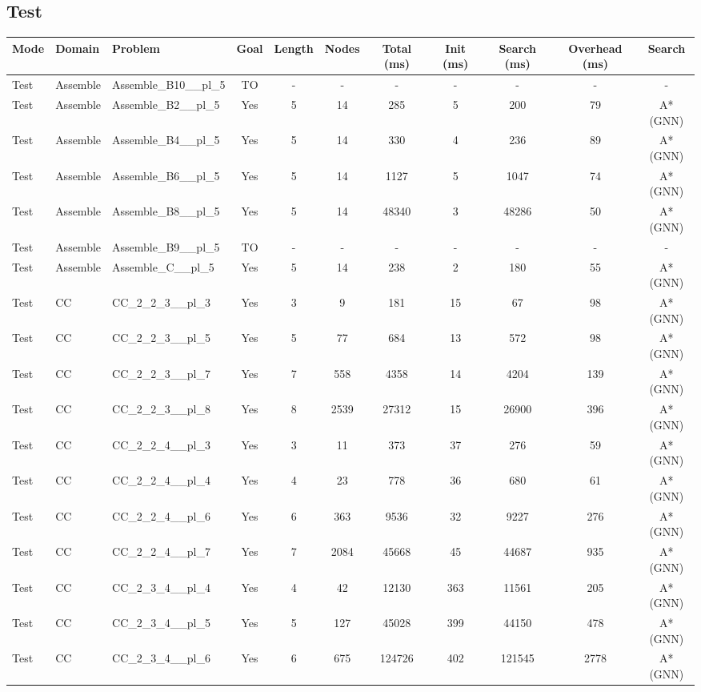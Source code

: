 \documentclass{article}
\begin{document}
\subsection*{Test}
\begin{tabular}{lllcccccccc}
\toprule
Mode & Domain & Problem & Goal & Length & Nodes & Total (ms) & Init (ms) & Search (ms) & Overhead (ms) & Search \\
\midrule
Test & Assemble & Assemble\_B10\_\_pl\_5 & TO & - & - & - & - & - & - & - \\
Test & Assemble & Assemble\_B2\_\_pl\_5 & Yes & 5 & 14 & 285 & 5 & 200 & 79 & A*(GNN) \\
Test & Assemble & Assemble\_B4\_\_pl\_5 & Yes & 5 & 14 & 330 & 4 & 236 & 89 & A*(GNN) \\
Test & Assemble & Assemble\_B6\_\_pl\_5 & Yes & 5 & 14 & 1127 & 5 & 1047 & 74 & A*(GNN) \\
Test & Assemble & Assemble\_B8\_\_pl\_5 & Yes & 5 & 14 & 48340 & 3 & 48286 & 50 & A*(GNN) \\
Test & Assemble & Assemble\_B9\_\_pl\_5 & TO & - & - & - & - & - & - & - \\
Test & Assemble & Assemble\_C\_\_pl\_5 & Yes & 5 & 14 & 238 & 2 & 180 & 55 & A*(GNN) \\
Test & CC & CC\_2\_2\_3\_\_pl\_3 & Yes & 3 & 9 & 181 & 15 & 67 & 98 & A*(GNN) \\
Test & CC & CC\_2\_2\_3\_\_pl\_5 & Yes & 5 & 77 & 684 & 13 & 572 & 98 & A*(GNN) \\
Test & CC & CC\_2\_2\_3\_\_pl\_7 & Yes & 7 & 558 & 4358 & 14 & 4204 & 139 & A*(GNN) \\
Test & CC & CC\_2\_2\_3\_\_pl\_8 & Yes & 8 & 2539 & 27312 & 15 & 26900 & 396 & A*(GNN) \\
Test & CC & CC\_2\_2\_4\_\_pl\_3 & Yes & 3 & 11 & 373 & 37 & 276 & 59 & A*(GNN) \\
Test & CC & CC\_2\_2\_4\_\_pl\_4 & Yes & 4 & 23 & 778 & 36 & 680 & 61 & A*(GNN) \\
Test & CC & CC\_2\_2\_4\_\_pl\_6 & Yes & 6 & 363 & 9536 & 32 & 9227 & 276 & A*(GNN) \\
Test & CC & CC\_2\_2\_4\_\_pl\_7 & Yes & 7 & 2084 & 45668 & 45 & 44687 & 935 & A*(GNN) \\
Test & CC & CC\_2\_3\_4\_\_pl\_4 & Yes & 4 & 42 & 12130 & 363 & 11561 & 205 & A*(GNN) \\
Test & CC & CC\_2\_3\_4\_\_pl\_5 & Yes & 5 & 127 & 45028 & 399 & 44150 & 478 & A*(GNN) \\
Test & CC & CC\_2\_3\_4\_\_pl\_6 & Yes & 6 & 675 & 124726 & 402 & 121545 & 2778 & A*(GNN) \\

\end{tabular}
\end{document}
